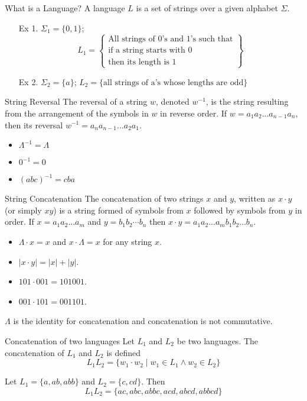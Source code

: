 \documentclass[notes=none]{beamer}
\begin{document}
\begin{frame}{What is a Language?}
    A language $L$  is a set of strings over a given alphabet $\Sigma$.
    \begin{itemize}
    \item [Ex 1.] $\Sigma_1=\{0,1\}$; 
    \[L_1=\left\{\begin{array}{c}
    \mbox{All strings of 0's and 1's such that}\\
    \mbox{if a string starts with 0}\\
    \mbox{then its length is 1} \end{array}\right\}\] 
    \item [Ex 2.] $\Sigma_2=\{a\}$; $L_2=\{\mbox{all strings of a's whose lengths are odd}\}$
    \end{itemize}
\end{frame}

\begin{frame}{String Reversal}
    The reversal of a string $w$, denoted $w^{-1}$,  is the string resulting from the arrangement of  the symbols in $w$ in reverse order. If $w=a_{1}a_{2}...a_{n-1}a_{n}$, then its reversal $w^{-1}=a_{n}a_{n-1}...a_{2}a_{1}$.
    \begin{itemize}
    \item $\Lambda^{-1}=\Lambda$
    \item $0^{-1}=0$
    \item $(abc)^{-1}=cba$
\end{itemize}
\end{frame}

\begin{frame}{String Concatenation}
    The concatenation of two strings $x$ and $y$, written as  $x\cdot y$ (or simply $xy$) is a string formed of symbols from $x$ followed by symbols from $y$ in order. If $x=a_{1}a_{2}...a_{m}$ and $y=b_1b_2\cdots b_n$ then $x\cdot y=a_1a_2...a_mb_1b_2...b_n$.
    \begin{itemize}
    \item $\Lambda\cdot x=x$ and $x\cdot\Lambda=x$ for any string $x$.
    \item $|x\cdot y| = |x|+|y|$.
    \item $101\cdot 001=101001$.
    \item $001\cdot 101=001101$.
\end{itemize}
$\Lambda$ is the identity for concatenation and concatenation is not commutative.
\end{frame}

\begin{frame}{Concatenation of two languages}
Let $L_1$ and $L_2$ be two languages. The concatenation of $L_1$ and $L_2$ is defined
\[ L_1L_2 = \{w_1\cdot w_2 \mid w_1\in L_1\wedge w_2\in L_2\}
\]

Let $L_1=\{a,ab,abb\}$ and $L_2=\{c,cd\}$. Then
\[ L_1L_2 = \{ac,abc,abbc,acd,abcd,abbcd\}
\]
\end{frame}
\end{document}

